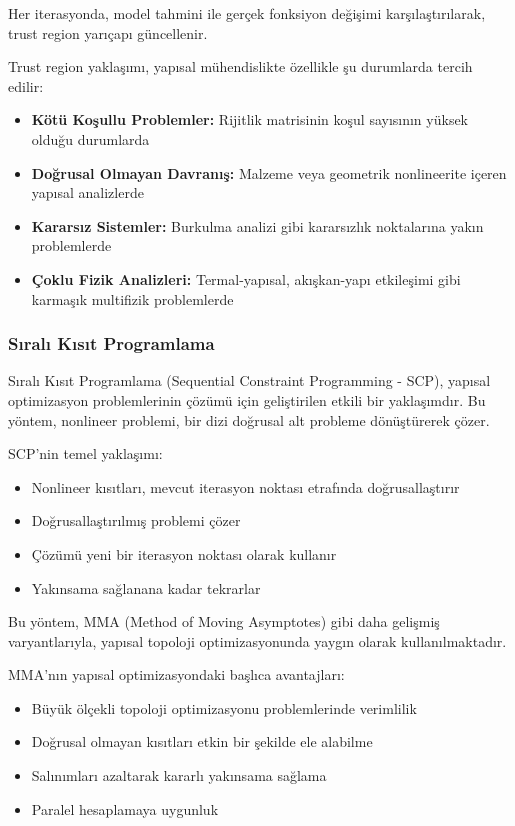 Her iterasyonda, model tahmini ile gerçek fonksiyon değişimi karşılaştırılarak, trust region yarıçapı güncellenir.

\begin{tcolorbox}[title=Yapısal Mühendislikte Trust Region Uygulamaları]
Trust region yaklaşımı, yapısal mühendislikte özellikle şu durumlarda tercih edilir:
\begin{itemize}
    \item \textbf{Kötü Koşullu Problemler:} Rijitlik matrisinin koşul sayısının yüksek olduğu durumlarda
    \item \textbf{Doğrusal Olmayan Davranış:} Malzeme veya geometrik nonlineerite içeren yapısal analizlerde
    \item \textbf{Kararsız Sistemler:} Burkulma analizi gibi kararsızlık noktalarına yakın problemlerde
    \item \textbf{Çoklu Fizik Analizleri:} Termal-yapısal, akışkan-yapı etkileşimi gibi karmaşık multifizik problemlerde
\end{itemize}
\end{tcolorbox}

\subsubsection{Sıralı Kısıt Programlama}

Sıralı Kısıt Programlama (Sequential Constraint Programming - SCP), yapısal optimizasyon problemlerinin çözümü için geliştirilen etkili bir yaklaşımdır. Bu yöntem, nonlineer problemi, bir dizi doğrusal alt probleme dönüştürerek çözer.

SCP'nin temel yaklaşımı:
\begin{itemize}
    \item Nonlineer kısıtları, mevcut iterasyon noktası etrafında doğrusallaştırır
    \item Doğrusallaştırılmış problemi çözer
    \item Çözümü yeni bir iterasyon noktası olarak kullanır
    \item Yakınsama sağlanana kadar tekrarlar
\end{itemize}

Bu yöntem, MMA (Method of Moving Asymptotes) gibi daha gelişmiş varyantlarıyla, yapısal topoloji optimizasyonunda yaygın olarak kullanılmaktadır.


MMA'nın yapısal optimizasyondaki başlıca avantajları:
\begin{itemize}
    \item Büyük ölçekli topoloji optimizasyonu problemlerinde verimlilik
    \item Doğrusal olmayan kısıtları etkin bir şekilde ele alabilme
    \item Salınımları azaltarak kararlı yakınsama sağlama
    \item Paralel hesaplamaya uygunluk
\end{itemize}

